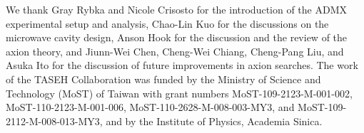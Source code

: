 \documentclass[%
preprint, %
 amsmath,amssymb,
 aps,
]{revtex4-2}
\begin{document}
\maketitle

\tableofcontents %









\begin{acknowledgments}
We thank Gray Rybka and Nicole Crisosto for the introduction of the ADMX 
experimental 
setup and analysis, Chao-Lin Kuo for the discussions on the microwave cavity 
design, Anson Hook for the discussion and the review of the 
axion theory, and Jiunn-Wei Chen, Cheng-Wei Chiang, Cheng-Pang Liu, and 
Asuka Ito for the discussion of future improvements in axion searches.  
  The work of the TASEH Collaboration was funded by 
the Ministry of Science and Technology (MoST) of Taiwan with grant numbers 
MoST-109-2123-M-001-002, MoST-110-2123-M-001-006, MoST-110-2628-M-008-003-MY3,
and MoST-109-2112-M-008-013-MY3, and by the Institute of Physics, Academia 
Sinica. 

\end{acknowledgments}

\appendix



\end{document}
